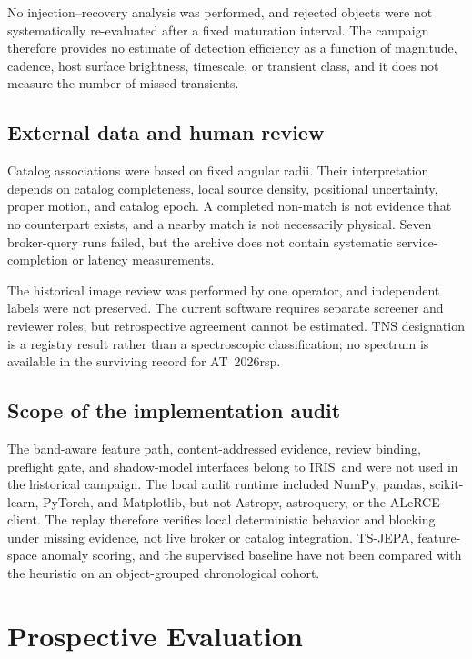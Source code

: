 \documentclass[11pt]{article}
\newcommand{\iris}{IRIS}
\begin{document}
No injection--recovery analysis was performed, and rejected objects were not systematically re-evaluated after a fixed maturation interval. The campaign therefore provides no estimate of detection efficiency as a function of magnitude, cadence, host surface brightness, timescale, or transient class, and it does not measure the number of missed transients.

\subsection{External data and human review}

Catalog associations were based on fixed angular radii. Their interpretation depends on catalog completeness, local source density, positional uncertainty, proper motion, and catalog epoch. A completed non-match is not evidence that no counterpart exists, and a nearby match is not necessarily physical. Seven broker-query runs failed, but the archive does not contain systematic service-completion or latency measurements.

The historical image review was performed by one operator, and independent labels were not preserved. The current software requires separate screener and reviewer roles, but retrospective agreement cannot be estimated. TNS designation is a registry result rather than a spectroscopic classification; no spectrum is available in the surviving record for AT~2026rsp.

\subsection{Scope of the implementation audit}

The band-aware feature path, content-addressed evidence, review binding, preflight gate, and shadow-model interfaces belong to \iris\ and were not used in the historical campaign. The local audit runtime included NumPy, pandas, scikit-learn, PyTorch, and Matplotlib, but not Astropy, astroquery, or the ALeRCE client. The replay therefore verifies local deterministic behavior and blocking under missing evidence, not live broker or catalog integration. TS-JEPA, feature-space anomaly scoring, and the supervised baseline have not been compared with the heuristic on an object-grouped chronological cohort.

\section{Prospective Evaluation}
\label{sec:validation}
\end{document}

